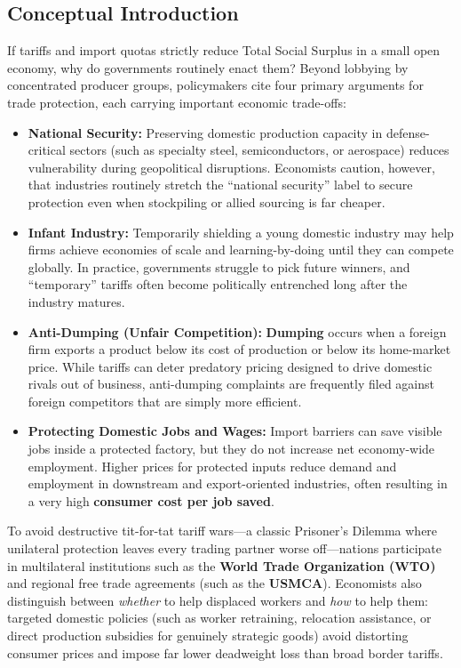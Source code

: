 \documentclass[11pt,letterpaper]{article}
\begin{document}
\subsection*{Conceptual Introduction}
If tariffs and import quotas strictly reduce Total Social Surplus in a small open economy, why do governments routinely enact them? Beyond lobbying by concentrated producer groups, policymakers cite four primary arguments for trade protection, each carrying important economic trade-offs:
\begin{itemize}
    \item \textbf{National Security:} Preserving domestic production capacity in defense-critical sectors (such as specialty steel, semiconductors, or aerospace) reduces vulnerability during geopolitical disruptions. Economists caution, however, that industries routinely stretch the ``national security'' label to secure protection even when stockpiling or allied sourcing is far cheaper.
    \item \textbf{Infant Industry:} Temporarily shielding a young domestic industry may help firms achieve economies of scale and learning-by-doing until they can compete globally. In practice, governments struggle to pick future winners, and ``temporary'' tariffs often become politically entrenched long after the industry matures.
    \item \textbf{Anti-Dumping (Unfair Competition):} \textbf{Dumping} occurs when a foreign firm exports a product below its cost of production or below its home-market price. While tariffs can deter predatory pricing designed to drive domestic rivals out of business, anti-dumping complaints are frequently filed against foreign competitors that are simply more efficient.
    \item \textbf{Protecting Domestic Jobs and Wages:} Import barriers can save visible jobs inside a protected factory, but they do not increase net economy-wide employment. Higher prices for protected inputs reduce demand and employment in downstream and export-oriented industries, often resulting in a very high \textbf{consumer cost per job saved}.
\end{itemize}

To avoid destructive tit-for-tat tariff wars---a classic Prisoner's Dilemma where unilateral protection leaves every trading partner worse off---nations participate in multilateral institutions such as the \textbf{World Trade Organization (WTO)} and regional free trade agreements (such as the \textbf{USMCA}). Economists also distinguish between \emph{whether} to help displaced workers and \emph{how} to help them: targeted domestic policies (such as worker retraining, relocation assistance, or direct production subsidies for genuinely strategic goods) avoid distorting consumer prices and impose far lower deadweight loss than broad border tariffs.
\end{document}
